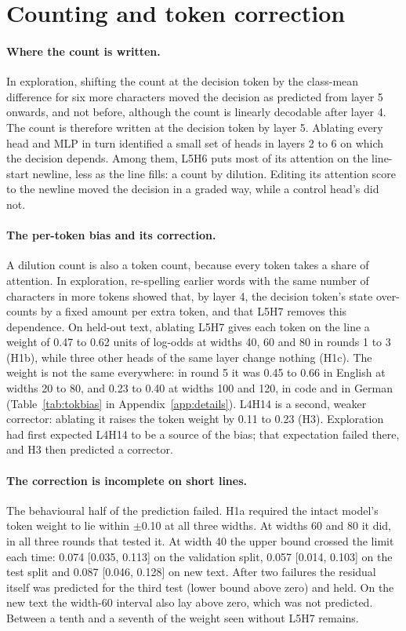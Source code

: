 \documentclass[11pt,a4paper]{article}
\begin{document}
\section{Counting and token correction}
\label{sec:count}

\paragraph{Where the count is written.}
In exploration, shifting the count at the decision token by the class-mean difference for six more characters moved the decision as predicted from layer 5 onwards, and not before, although the count is linearly decodable after layer 4. The count is therefore written at the decision token by layer 5. Ablating every head and MLP in turn identified a small set of heads in layers 2 to 6 on which the decision depends. Among them, L5H6 puts most of its attention on the line-start newline, less as the line fills: a count by dilution. Editing its attention score to the newline moved the decision in a graded way, while a control head's did not.

\paragraph{The per-token bias and its correction.}
A dilution count is also a token count, because every token takes a share of attention. In exploration, re-spelling earlier words with the same number of characters in more tokens showed that, by layer 4, the decision token's state over-counts by a fixed amount per extra token, and that L5H7 removes this dependence. On held-out text, ablating L5H7 gives each token on the line a weight of 0.47 to 0.62 units of log-odds at widths 40, 60 and 80 in rounds 1 to 3 (H1b), while three other heads of the same layer change nothing (H1c). The weight is not the same everywhere: in round 5 it was 0.45 to 0.66 in English at widths 20 to 80, and 0.23 to 0.40 at widths 100 and 120, in code and in German (Table~\ref{tab:tokbias} in Appendix~\ref{app:details}). L4H14 is a second, weaker corrector: ablating it raises the token weight by 0.11 to 0.23 (H3). Exploration had first expected L4H14 to be a source of the bias; that expectation failed there, and H3 then predicted a corrector.

\paragraph{The correction is incomplete on short lines.}
The behavioural half of the prediction failed. H1a required the intact model's token weight to lie within $\pm$0.10 at all three widths. At widths 60 and 80 it did, in all three rounds that tested it. At width 40 the upper bound crossed the limit each time: 0.074 [0.035, 0.113] on the validation split, 0.057 [0.014, 0.103] on the test split and 0.087 [0.046, 0.128] on new text. After two failures the residual itself was predicted for the third test (lower bound above zero) and held. On the new text the width-60 interval also lay above zero, which was not predicted. Between a tenth and a seventh of the weight seen without L5H7 remains.
\end{document}
